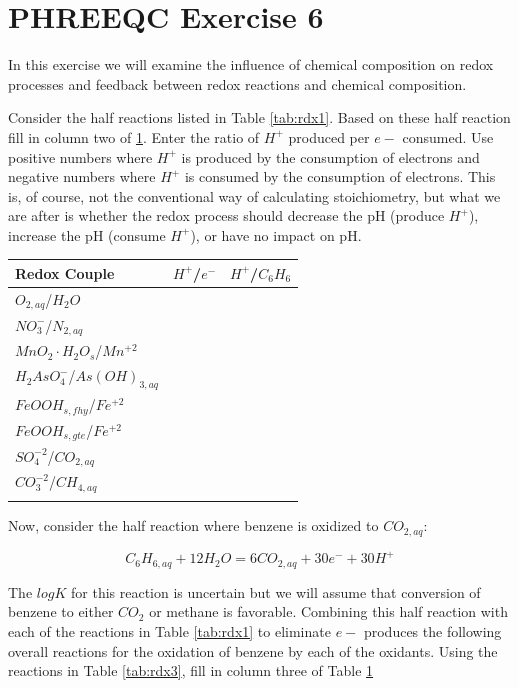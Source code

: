 \section[PHREEQC Exercise 6]{PHREEQC Exercise 6}
In this exercise we will examine the influence of chemical composition 
on redox processes and feedback between redox reactions and chemical composition.

Consider the half reactions listed in Table \ref{tab:rdx1}.  
Based on these half reaction fill in column two of \ref{tab:rdx2}. 
Enter the ratio of $H^+$ produced per $e-$ consumed.  
Use positive numbers where $H^+$ is produced by the consumption of 
electrons and negative numbers where $H^+$ is 
consumed by the consumption of electrons.  
This is, of course, not the conventional way of calculating stoichiometry, 
but what we are after is whether the redox process should 
decrease the pH (produce $H^+$), 
increase the pH (consume $H^+$), or have no impact on pH.  	

\begin{table}[h]
\centering
\footnotesize
\begin{tabular}{lll}
\toprule
Redox Couple	& $H^+$/$e^-$	& $H^+$/$C_6H_6$ \\
\midrule
$O_{2,aq}$/$H_2O$	         & & \\
$NO_3^-$/$N_{2,aq}$	       & & \\
$MnO_2·H_2O_{s}$/$Mn^{+2}$ & & \\
$H_2AsO_4^-$/$As(OH)_{3,aq}$ & & \\
$FeOOH_{s,fhy}$/$Fe^{+2}$ 	 & & \\
$FeOOH_{s,gte}$/$Fe^{+2}$ 	 & & \\
$SO_4^{-2}$/$CO_{2,aq}$ 		 & & \\
$CO_3^{-2}$/$CH_{4,aq}$      & & \\
\bottomrule
\label{tab:rdx2}
\end{tabular}
\end{table}	

Now, consider the half reaction where benzene is oxidized to $CO_{2,aq}$: 

\begin{equation}
C_6H_{6,aq} + 12H_2O   =  6CO_{2,aq} + 30e^- + 30H^+
\label{eq:rdx8}
\end{equation}

The $logK$ for this reaction is uncertain but we will assume that conversion 
of benzene to either $CO_2$ or methane is favorable.  
Combining this half reaction with each of the reactions in 
Table \ref{tab:rdx1} to eliminate $e-$ produces the following overall 
reactions for the oxidation of benzene by each of the oxidants.  
Using the reactions in Table \ref{tab:rdx3}, 
fill in column three of Table \ref{tab:rdx2}

